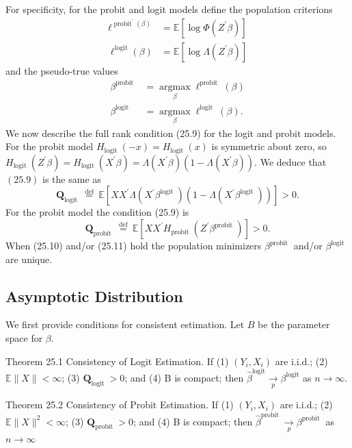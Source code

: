 \documentclass[10pt]{article}
\begin{document}
For specificity, for the probit and logit models define the population criterions
$$
\begin{aligned}
\ell^{\operatorname{probit}^{\prime}(\beta)} &=\mathbb{E}\left[\log \Phi\left(Z^{\prime} \beta\right)\right] \\
\ell^{\operatorname{logit}}(\beta) &=\mathbb{E}\left[\log \Lambda\left(Z^{\prime} \beta\right)\right]
\end{aligned}
$$
and the pseudo-true values
$$
\begin{aligned}
\beta^{\text {probit }} &=\underset{\beta}{\operatorname{argmax}} \ell^{\text {probit }}(\beta) \\
\beta^{\text {logit }} &=\underset{\beta}{\operatorname{argmax}} \ell^{\text {logit }}(\beta) .
\end{aligned}
$$
We now describe the full rank condition (25.9) for the logit and probit models. For the probit model $H_{\text {logit }}(-x)=H_{\text {logit }}(x)$ is symmetric about zero, so $H_{\text {logit }}\left(Z^{\prime} \beta\right)=H_{\text {logit }}\left(X^{\prime} \beta\right)=\Lambda\left(X^{\prime} \beta\right)\left(1-\Lambda\left(X^{\prime} \beta\right)\right)$. We deduce that $(25.9)$ is the same as
$$
\boldsymbol{Q}_{\text {logit }} \stackrel{\text { def }}{=} \mathbb{E}\left[X X^{\prime} \Lambda\left(X^{\prime} \beta^{\text {logit }}\right)\left(1-\Lambda\left(X^{\prime} \beta^{\text {logit }}\right)\right)\right]>0 .
$$
For the probit model the condition (25.9) is
$$
\boldsymbol{Q}_{\text {probit }} \stackrel{\text { def }}{=} \mathbb{E}\left[X X^{\prime} H_{\text {probit }}\left(Z^{\prime} \beta^{\text {probit }}\right)\right]>0 .
$$
When (25.10) and/or (25.11) hold the population minimizers $\beta^{\text {probit }}$ and/or $\beta^{\text {logit }}$ are unique.

\subsection{Asymptotic Distribution}
We first provide conditions for consistent estimation. Let $B$ be the parameter space for $\beta$.

Theorem 25.1 Consistency of Logit Estimation. If (1) $\left(Y_{i}, X_{i}\right)$ are i.i.d.; (2) $\mathbb{E}\|X\|<\infty$; (3) $\boldsymbol{Q}_{\text {logit }}>0$; and (4) B is compact; then $\widehat{\beta}^{\operatorname{logit}} \underset{p}{\longrightarrow} \beta^{\operatorname{logit}}$ as $n \rightarrow \infty$.

Theorem 25.2 Consistency of Probit Estimation. If (1) $\left(Y_{i}, X_{i}\right)$ are i.i.d.; (2) $\mathbb{E}\|X\|^{2}<\infty$; (3) $\boldsymbol{Q}_{\text {probit }}>0$; and (4) B is compact; then $\widehat{\beta}^{\text {probit }} \underset{p}{\longrightarrow} \beta^{\text {probit }}$ as $n \rightarrow \infty$
\end{document}
